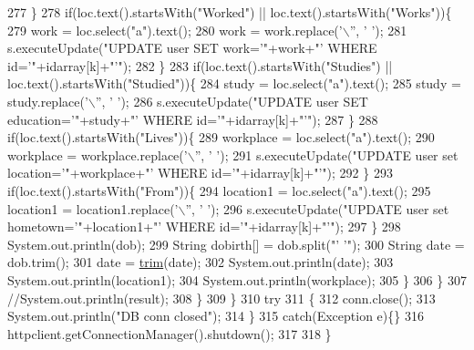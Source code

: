 \begin{DoxyCode}
277                 \}
278                 \textcolor{keywordflow}{if}(loc.text().startsWith(\textcolor{stringliteral}{"Worked"}) || loc.text().startsWith(\textcolor{stringliteral}{"Works"}))\{
279                     work = loc.select(\textcolor{stringliteral}{"a"}).text();
280                     work = work.replace(\textcolor{charliteral}{'\(\backslash\)''}, \textcolor{charliteral}{' '});
281                     s.executeUpdate(\textcolor{stringliteral}{"UPDATE user SET work='"}+work+\textcolor{stringliteral}{"' WHERE id='"}+idarray[k]+\textcolor{stringliteral}{"'"});
282                 \}
283                 \textcolor{keywordflow}{if}(loc.text().startsWith(\textcolor{stringliteral}{"Studies"}) || loc.text().startsWith(\textcolor{stringliteral}{"Studied"}))\{
284                     study = loc.select(\textcolor{stringliteral}{"a"}).text();
285                     study = study.replace(\textcolor{charliteral}{'\(\backslash\)''}, \textcolor{charliteral}{' '});
286                     s.executeUpdate(\textcolor{stringliteral}{"UPDATE user SET education='"}+study+\textcolor{stringliteral}{"' WHERE id='"}+idarray[k]+\textcolor{stringliteral}{"'"});
287                 \}
288                 \textcolor{keywordflow}{if}(loc.text().startsWith(\textcolor{stringliteral}{"Lives"}))\{
289                     workplace = loc.select(\textcolor{stringliteral}{"a"}).text();
290                     workplace = workplace.replace(\textcolor{charliteral}{'\(\backslash\)''}, \textcolor{charliteral}{' '});
291                     s.executeUpdate(\textcolor{stringliteral}{"UPDATE user set location='"}+workplace+\textcolor{stringliteral}{"' WHERE id='"}+idarray[k]+\textcolor{stringliteral}{"'"});
292                 \}
293                 \textcolor{keywordflow}{if}(loc.text().startsWith(\textcolor{stringliteral}{"From"}))\{
294                     location1 = loc.select(\textcolor{stringliteral}{"a"}).text();
295                     location1 = location1.replace(\textcolor{charliteral}{'\(\backslash\)''}, \textcolor{charliteral}{' '});
296                     s.executeUpdate(\textcolor{stringliteral}{"UPDATE user set hometown='"}+location1+\textcolor{stringliteral}{"' WHERE id='"}+idarray[k]+\textcolor{stringliteral}{"'"});
297                 \}
298                 System.out.println(dob);
299                 String dobirth[] = dob.split(\textcolor{stringliteral}{"' '"});
300                 String date = dob.trim();
301                 date = \hyperlink{class_facebook_deep_crawl_a115a735af318b0dd4a1dee957eb23b48}{trim}(date);
302                 System.out.println(date);
303                 System.out.println(location1);
304                 System.out.println(workplace);
305             \}
306             \}
307             \textcolor{comment}{//System.out.println(result);}
308         \}
309         \}
310         \textcolor{keywordflow}{try}
311         \{
312             conn.close();
313             System.out.println(\textcolor{stringliteral}{"DB conn closed"});
314         \}
315         \textcolor{keywordflow}{catch}(Exception e)\{\}
316         httpclient.getConnectionManager().shutdown();
317         
318     \}
\end{DoxyCode}
